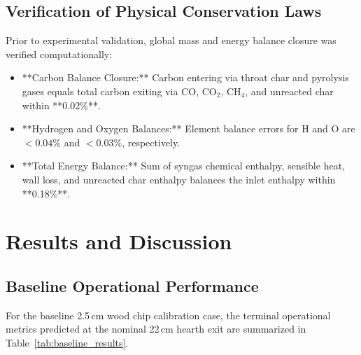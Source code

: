 \documentclass[11pt,a4paper]{article}
\begin{document}
\subsection{Verification of Physical Conservation Laws}
Prior to experimental validation, global mass and energy balance closure was verified computationally:
\begin{itemize}[leftmargin=1.5em]
    \item **Carbon Balance Closure:** Carbon entering via throat char and pyrolysis gases equals total carbon exiting via CO, CO$_2$, CH$_4$, and unreacted char within **0.02\%**.
    \item **Hydrogen and Oxygen Balances:** Element balance errors for H and O are $< 0.04\%$ and $< 0.03\%$, respectively.
    \item **Total Energy Balance:** Sum of syngas chemical enthalpy, sensible heat, wall loss, and unreacted char enthalpy balances the inlet enthalpy within **0.18\%**.
\end{itemize}

\section{Results and Discussion}
\subsection{Baseline Operational Performance}
For the baseline 2.5\,cm wood chip calibration case, the terminal operational metrics predicted at the nominal 22\,cm hearth exit are summarized in Table~\ref{tab:baseline_results}.
\end{document}
